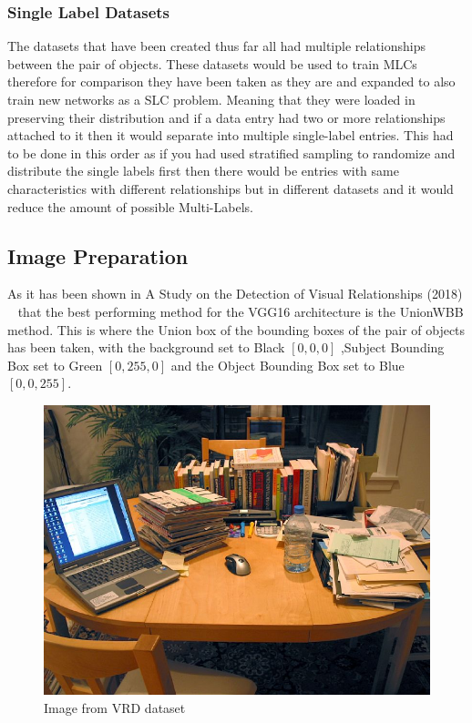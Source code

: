 \documentclass{csfyp}
\begin{document}
\subsubsection{Single Label Datasets}
The datasets that have been created thus far all had multiple relationships between the pair of objects. These datasets would be used to train MLCs therefore for comparison they have been taken as they are and expanded to also train new networks as a SLC problem. Meaning that they were loaded in preserving their distribution and if a data entry had two or more relationships attached to it then it would separate into multiple single-label entries. This had to be done in this order as if you had used stratified sampling to randomize and distribute the single labels first then there would be entries with same characteristics with different relationships but in different datasets and it would reduce the amount of possible Multi-Labels.

\subsection{Image Preparation}
As it has been shown in A Study on the Detection of Visual Relationships (2018) ~\cite{detectionRelationships} that the best performing method for the VGG16 architecture is the \Gls{UnionWBB} method. This is where the Union box of the bounding boxes of the pair of objects has been taken, with the background set to Black $[0,0,0]$ ,Subject Bounding Box set to Green $[0,255,0]$ and the Object Bounding Box set to Blue $[0,0,255]$.

\begin{figure}[!htbp]
\centering
\includegraphics[scale=0.25]{originalImage.pdf}
\caption{Image from VRD dataset}
\end{figure}
\end{document}

